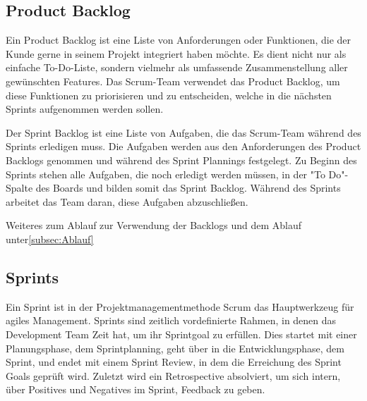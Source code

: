 \subsection{Product Backlog}\label{subsec:product-backlog}
%
Ein Product Backlog ist eine Liste von Anforderungen oder Funktionen, die der Kunde gerne in seinem Projekt integriert haben möchte.
Es dient nicht nur als einfache To-Do-Liste, sondern vielmehr als umfassende Zusammenstellung aller gewünschten Features.
Das Scrum-Team verwendet das Product Backlog, um diese Funktionen zu priorisieren und zu entscheiden, welche in die nächsten Sprints aufgenommen werden sollen.\cite[.vgl]{ProductBacklog}

Der Sprint Backlog ist eine Liste von Aufgaben, die das Scrum-Team während des Sprints erledigen muss.
Die Aufgaben werden aus den Anforderungen des Product Backlogs genommen und während des Sprint Plannings festgelegt.
Zu Beginn des Sprints stehen alle Aufgaben, die noch erledigt werden müssen, in der "To Do"-Spalte des Boards und bilden somit das Sprint Backlog.
Während des Sprints arbeitet das Team daran, diese Aufgaben abzuschließen.\cite{SprintBacklog}

Weiteres zum Ablauf zur Verwendung der Backlogs und dem Ablauf unter\ref{subsec:Ablauf}

%

\subsection{Sprints}\label{subsec:sprints}
%
Ein Sprint ist in der Projektmanagementmethode Scrum das Hauptwerkzeug für agiles Management. Sprints sind zeitlich vordefinierte Rahmen, in denen das Development Team Zeit hat, um ihr Sprintgoal zu erfüllen.
Dies startet mit einer Planungsphase, dem Sprintplanning, geht über in die Entwicklungsphase, dem Sprint, und endet mit einem Sprint Review, in dem die Erreichung des Sprint Goals geprüft wird.
Zuletzt wird ein Retrospective absolviert, um sich intern, über Positives und Negatives im Sprint, Feedback zu geben. 
%
